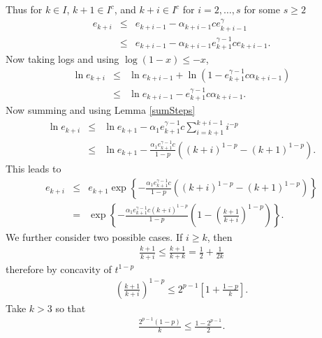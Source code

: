 \begin{comment}
Then by (\ref{case3}) if
\begin{eqnarray}
k>k_2 = 
\left\{
\begin{array}{c}
C^{2 d\theta}\\
0:\quad \theta=\frac{1}{2}
\end{array}
\right.
\end{eqnarray}
\end{comment}
Thus for $k\in I$, $k+1\in I^c$, and $k+i\in I^c$ for $i=2,\ldots, s$ for some $s\geq 2$
\begin{eqnarray}
e_{k+i}&\leq& e_{k+i-1}-\alpha_{k+i-1} c e_{k+i-1}^\gamma
\nonumber\\\label{innovate}
&\leq& 
e_{k+i-1}-\alpha_{k+i-1} e_{k+1}^{\gamma-1} c  e_{k+i-1}.
\end{eqnarray}
Now taking logs and using $\log(1-x)\leq-x$, 
\begin{eqnarray*}
\ln e_{k+i}
&\leq&
\ln e_{k+i-1} + \ln(1-e_{k+1}^{\gamma-1} c \alpha_{k+i-1} )
\\
&\leq&
\ln e_{k+i-1} - e_{k+1}^{\gamma-1} c\alpha_{k+i-1} .
\end{eqnarray*}
Now summing and using Lemma \ref{sumSteps} 
\begin{eqnarray*}
\ln e_{k+i}
&\leq&
\ln e_{k+1}-\alpha_1  e_{k+1}^{\gamma-1}c\sum_{i=k+1}^{k+i-1}i^{-p}
\\
&\leq&
\ln e_{k+1}-\frac{\alpha_1 e_{k+1}^{\gamma-1}c }{1-p}\left(
(k+i)^{1-p}-(k+1)^{1-p}
\right).
\end{eqnarray*}
This leads to
\begin{eqnarray}
e_{k+i}
&\leq&
e_{k+1}
\exp
\left\{-\frac{\alpha_1 e_{k+1}^{\gamma-1} c}{1-p}\left((k+i)^{1-p}-(k+1)^{1-p}\right)
\right\}\label{expForm}
\\\nonumber
&=&
\exp
\left\{-\frac{\alpha_1 e_{k+1}^{\gamma-1} c(k+i)^{1-p}}{1-p}\left(1-\left(\frac{k+1}{k+i}\right)^{1-p}\right)
\right\}.
\end{eqnarray}
We further consider two possible cases. If $i\geq k$, then 
\begin{eqnarray*}
\frac{k+1}{k+i}
\leq
\frac{k+1}{k+k}
=
\frac{1}{2}+\frac{1}{2k}
\end{eqnarray*}
therefore by concavity of $t^{1-p}$
\begin{eqnarray*}
\left(
\frac{k+1}{k+i}
\right)^{1-p}
\leq
2^{p-1}\left[1+\frac{1-p}{k}\right].
\end{eqnarray*}
Take 
$
k>3
$
so that
\begin{eqnarray*}
\frac{2^{p-1}(1-p)}{k}\leq \frac{1-2^{p-1}}{2}.
\end{eqnarray*}
